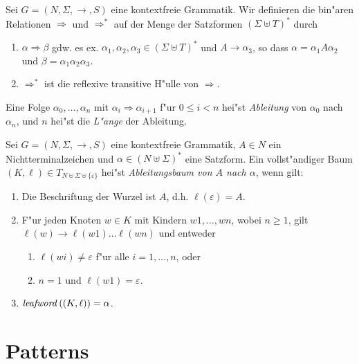 \documentclass[12pt,a4paper]{article}
\begin{document}
\begin{definition}[Ableitungen]
  Sei $G=(N,\Sigma,\to,S)$ eine kontextfreie Grammatik. Wir definieren die bin"aren Relationen $\Rightarrow$
  und $\Rightarrow^*$ auf der Menge der Satzformen $(\Sigma \uplus T)^*$ durch
  \begin{enumerate}
  \item $\alpha \Rightarrow \beta$ gdw. es ex. $\alpha_1,\alpha_2,\alpha_3\in (\Sigma \uplus T)^*$ und
    $A \to \alpha_3$, so dass $\alpha = \alpha_1 A \alpha_2$ und $\beta = \alpha_1\alpha_2\alpha_3$.
  \item $\Rightarrow^*$ ist die reflexive transitive H"ulle von $\Rightarrow$.
  \end{enumerate}
  Eine Folge $\alpha_0,\ldots,\alpha_n$ mit $\alpha_i \Rightarrow \alpha_{i+1}$ f"ur $0 \le i < n$ hei"st
  \emph{Ableitung} von $\alpha_0$ nach $\alpha_n$, und $n$ hei"st die \emph{L"ange} der Ableitung.
\end{definition}

\begin{definition}[Ableitungsbaum]
  Sei $G=(N,\Sigma,\to,S)$ eine kontextfreie Grammatik, $A \in N$ ein Nichtterminalzeichen und
  $\alpha \in (N \uplus \Sigma)^*$ eine Satzform. Ein vollst"andiger Baum
  $(K,\ell) \in T_{N \uplus \Sigma \uplus \{\varepsilon\}}$ hei"st
  \emph{Ableitungsbaum von $A$ nach $\alpha$}, wenn gilt:
  \begin{enumerate}
  \item Die Beschriftung der Wurzel ist $A$, d.h. $\ell(\varepsilon)=A$.
  \item F"ur jeden Knoten $w \in K$ mit Kindern $w1,\ldots,wn$, wobei $n \ge 1$, gilt
    $\ell(w) \to \ell(w1)\ldots\ell(wn)$ und entweder
    \begin{enumerate}
    \item $\ell(wi)\ne\varepsilon$ f"ur alle $i=1,\ldots,n$, oder
    \item $n = 1$ und $\ell(w1)=\varepsilon$.
    \end{enumerate}
  \item $\mathit{leafword}\,((K,\ell)) = \alpha$.
  \end{enumerate}
\end{definition}


\section{Patterns}
\end{document}
